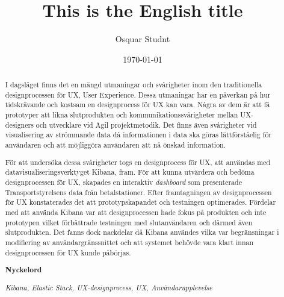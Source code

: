 \documentclass[12pt]{kththesis}
\title{This is the English title}
\author{Osquar Studnt}
\date{\today}
\begin{document}
\renewcommand\appendixname{Appendix}
\renewcommand\appendixpagename{Appendix}
\renewcommand\appendixtocname{Appendix}
\pagestyle{MyStyle}


\frontmatter
\afterpage{\null\newpage}


\afterpage{\null\newpage}

\begin{otherlanguage}{swedish}
  \begin{abstract}
\afterpage{\null\newpage}

I dagsläget finns det en mängd utmaningar och svårigheter inom den traditionella designprocessen för UX, User Experience. Dessa utmaningar har en påverkan på hur tidskrävande och kostsam en designprocess för UX kan vara. Några av dem är att få prototyper att likna slutprodukten och kommunikationssvårigheter mellan UX-designers och utvecklare vid Agil projektmetodik. Det finns även svårigheter vid visualisering av strömmande data då informationen i data ska göras lättförståelig för användaren och att möjliggöra användaren att nå önskad information.

För att undersöka dessa svårigheter togs en designprocess för UX, att användas med datavisualiseringsverktyget Kibana, fram. För att kunna utvärdera och bedöma designprocessen för UX, skapades en interaktiv \textit{dashboard} som presenterade Transportstyrelsens data från betalstationer. Efter framtagningen av designprocessen för UX konstaterades det att prototypskapandet och testningen optimerades. Fördelar med att använda Kibana var att designprocessen hade fokus på produkten och inte prototypen vilket förbättrade testningen med slutanvändaren och därmed även slutprodukten. Det fanns dock nackdelar då Kibana användes vilka var begränsningar i modifiering av användargränssnittet och att systemet behövde vara klart innan designprocessen för UX kunde påbörjas. 


\textbf{Nyckelord}

\textit{Kibana, Elastic Stack, UX-designprocess, UX, Användarupplevelse}

 \end{abstract}
\end{otherlanguage}
 
\afterpage{\null\newpage}
\end{document}
